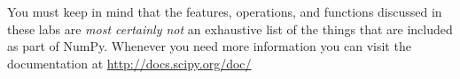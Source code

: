 You must keep in mind that the features, operations, and functions
discussed in these labs are \emph{most certainly not} an exhaustive list
of the things that are included as part of NumPy. Whenever you need more
information you can visit the documentation at
\url{http://docs.scipy.org/doc/}

